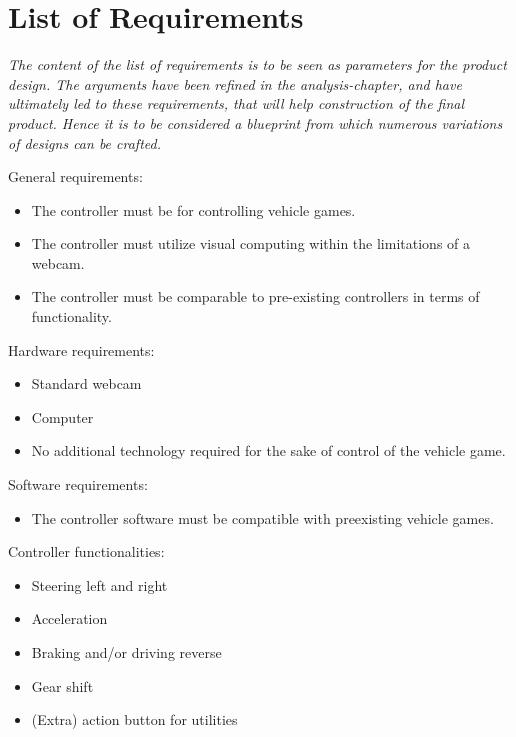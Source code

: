 \section{List of Requirements}

\textit{The content of the list of requirements is to be seen as parameters for the product design. The arguments have been refined in the analysis-chapter, and have ultimately led to these requirements, that will help construction of the final product. Hence it is to be considered a blueprint from which numerous variations of designs can be crafted.}
\bigskip

General requirements:
\begin{itemize}
\item The controller must be for controlling vehicle games.
\item The controller must utilize visual computing within the limitations of a webcam.
\item The controller must be comparable to pre-existing controllers in terms of functionality.
\end{itemize}
Hardware requirements:
\begin{itemize}
\item Standard webcam
\item Computer
\item No additional technology required for the sake of control of the vehicle game.
\end{itemize}
Software requirements:
\begin{itemize}
\item The controller software must be compatible with preexisting vehicle games.
\end{itemize}
Controller functionalities:
\begin{itemize}
\item Steering left and right
\item Acceleration
\item Braking and/or driving reverse
\item Gear shift
\item (Extra) action button for utilities 
\end{itemize}